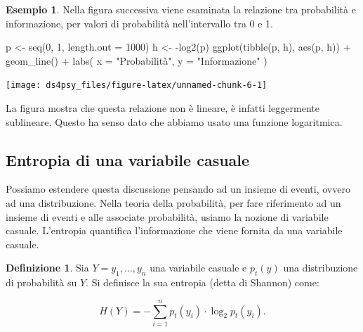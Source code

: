 \documentclass[
  11pt,
]{krantz}
\makeatletter
\newenvironment{Shaded}{\begin{snugshade}}{\end{snugshade}}
\newcommand{\AttributeTok}[1]{\textcolor[rgb]{0.61,0.61,0.61}{#1}}
\newcommand{\DecValTok}[1]{\textcolor[rgb]{0.06,0.06,0.06}{#1}}
\newcommand{\FunctionTok}[1]{\textcolor[rgb]{0,0,0}{#1}}
\newcommand{\NormalTok}[1]{#1}
\newcommand{\OtherTok}[1]{\textcolor[rgb]{0.37,0.37,0.37}{#1}}
\newcommand{\SpecialCharTok}[1]{\textcolor[rgb]{0,0,0}{#1}}
\newcommand{\StringTok}[1]{\textcolor[rgb]{0.5,0.5,0.5}{#1}}
\newenvironment{kframe}{%
\medskip{}
\setlength{\fboxsep}{.8em}
 \def\at@end@of@kframe{}%
 \ifinner\ifhmode%
  \def\at@end@of@kframe{\end{minipage}}%
  \begin{minipage}{\columnwidth}%
 \fi\fi%
 \def\FrameCommand##1{\hskip\@totalleftmargin \hskip-\fboxsep
 \colorbox{shadecolor}{##1}\hskip-\fboxsep
     \hskip-\linewidth \hskip-\@totalleftmargin \hskip\columnwidth}%
 \MakeFramed {\advance\hsize-\width
   \@totalleftmargin\z@ \linewidth\hsize
   \@setminipage}}%
 {\par\unskip\endMakeFramed%
 \at@end@of@kframe}
\renewenvironment{Shaded}{\begin{kframe}}{\end{kframe}}
\theoremstyle{definition}
\newtheorem{definition}{Definizione}[chapter]
\theoremstyle{definition}
\newtheorem{example}{Esempio}[chapter]
\theoremstyle{definition}
\theoremstyle{definition}
\theoremstyle{remark}
\makeatother
\begin{document}
\begin{example}
Nella figura successiva viene esaminata la relazione tra probabilità e informazione, per valori di probabilità nell'intervallo tra 0 e 1.

\begin{Shaded}
\begin{Highlighting}[]
\NormalTok{p }\OtherTok{\textless{}{-}} \FunctionTok{seq}\NormalTok{(}\DecValTok{0}\NormalTok{, }\DecValTok{1}\NormalTok{, }\AttributeTok{length.out =} \DecValTok{1000}\NormalTok{)}
\NormalTok{h }\OtherTok{\textless{}{-}} \SpecialCharTok{{-}}\FunctionTok{log2}\NormalTok{(p)}
\FunctionTok{ggplot}\NormalTok{(}\FunctionTok{tibble}\NormalTok{(p, h), }\FunctionTok{aes}\NormalTok{(p, h)) }\SpecialCharTok{+}
  \FunctionTok{geom\_line}\NormalTok{() }\SpecialCharTok{+}
  \FunctionTok{labs}\NormalTok{(}
    \AttributeTok{x =} \StringTok{"Probabilità"}\NormalTok{,}
    \AttributeTok{y =} \StringTok{"Informazione"}
\NormalTok{  )}
\end{Highlighting}
\end{Shaded}

\begin{center}\texttt{[image: ds4psy\_files/figure-latex/unnamed-chunk-6-1]} \end{center}

La figura mostra che questa relazione non è lineare, è infatti leggermente sublineare. Questo ha senso dato che abbiamo usato una funzione logaritmica.
\end{example}

\hypertarget{entropia-di-una-variabile-casuale}{%
\subsection{Entropia di una variabile casuale}\label{entropia-di-una-variabile-casuale}}

Possiamo estendere questa discussione pensando ad un insieme di eventi, ovvero ad una distribuzione. Nella teoria della probabilità, per fare riferimento ad un insieme di eventi e alle associate probabilità, usiamo la nozione di variabile casuale. L'entropia quantifica l'informazione che viene fornita da una variabile casuale.

\begin{definition}
Sia \(Y = y_1, \dots, y_n\) una variabile casuale e \(p_t(y)\) una distribuzione di probabilità su \(Y\). Si definisce la sua entropia (detta di Shannon) come:

\begin{equation}
H(Y) = - \sum_{i=1}^n p_t(y_i) \cdot \log_2 p_t(y_i).
\label{eq:entropy}
\end{equation}
\end{definition}
\end{document}
